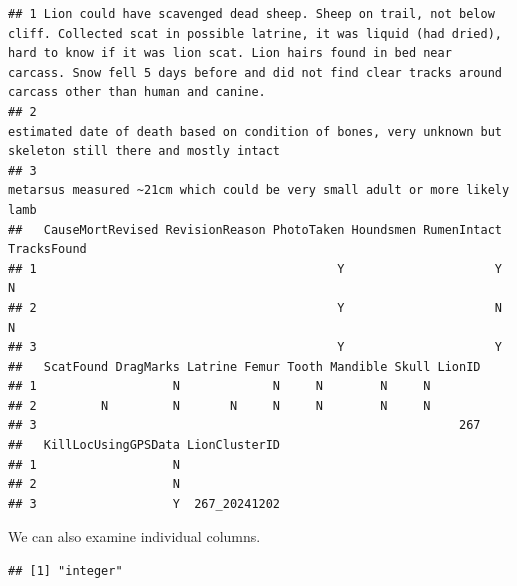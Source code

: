 \documentclass[
]{book}
\newenvironment{Shaded}{\begin{snugshade}}{\end{snugshade}}
\newcommand{\FunctionTok}[1]{\textcolor[rgb]{0.13,0.29,0.53}{\textbf{#1}}}
\newcommand{\NormalTok}[1]{#1}
\newcommand{\SpecialCharTok}[1]{\textcolor[rgb]{0.81,0.36,0.00}{\textbf{#1}}}
\begin{document}
\begin{verbatim}
## 1 Lion could have scavenged dead sheep. Sheep on trail, not below cliff. Collected scat in possible latrine, it was liquid (had dried), hard to know if it was lion scat. Lion hairs found in bed near carcass. Snow fell 5 days before and did not find clear tracks around carcass other than human and canine.
## 2                                                                                                                                                                                                    estimated date of death based on condition of bones, very unknown but skeleton still there and mostly intact
## 3                                                                                                                                                                                                                                     metarsus measured ~21cm which could be very small adult or more likely lamb
##   CauseMortRevised RevisionReason PhotoTaken Houndsmen RumenIntact TracksFound
## 1                                          Y                     Y           N
## 2                                          Y                     N           N
## 3                                          Y                     Y            
##   ScatFound DragMarks Latrine Femur Tooth Mandible Skull LionID
## 1                   N             N     N        N     N       
## 2         N         N       N     N     N        N     N       
## 3                                                           267
##   KillLocUsingGPSData LionClusterID
## 1                   N              
## 2                   N              
## 3                   Y  267_20241202
\end{verbatim}

We can also examine individual columns.

\begin{Shaded}
\end{Shaded}

\begin{verbatim}
## [1] "integer"
\end{verbatim}

\begin{Shaded}
\end{Shaded}
\end{document}
